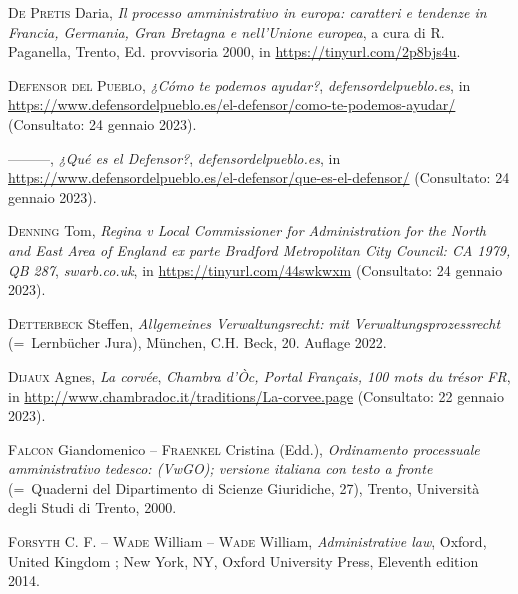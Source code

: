 \documentclass[12pt,it,a4paper,]{report}
\newlength{\cslhangindent}
\newenvironment{CSLReferences}[2] %
 {%
  \setlength{\parindent}{0pt}
  \ifodd #1 \everypar{\setlength{\hangindent}{\cslhangindent}}\ignorespaces\fi
  \ifnum #2 > 0
  \setlength{\parskip}{#2\baselineskip}
  \fi
 }%
 {}
\begin{document}
\begin{CSLReferences}{1}{0}
\leavevmode{}%
\textsc{De Pretis} Daria, \emph{Il processo amministrativo in europa:
caratteri e tendenze in Francia, Germania, Gran Bretagna e nell'Unione
europea}, a cura di R. Paganella, Trento, Ed. provvisoria 2000, in
\url{https://tinyurl.com/2p8bjs4u}.

\leavevmode{}%
\textsc{Defensor del Pueblo}, \emph{¿Cómo te podemos ayudar?},
\emph{defensordelpueblo.es}, in
\url{https://www.defensordelpueblo.es/el-defensor/como-te-podemos-ayudar/}
(Consultato: 24 gennaio 2023).

\leavevmode{}%
---------, \emph{¿Qué es el Defensor?}, \emph{defensordelpueblo.es}, in
\url{https://www.defensordelpueblo.es/el-defensor/que-es-el-defensor/}
(Consultato: 24 gennaio 2023).

\leavevmode{}%
\textsc{Denning} Tom, \emph{Regina v Local Commissioner for
Administration for the North and East Area of England ex parte Bradford
Metropolitan City Council: CA 1979, QB 287}, \emph{swarb.co.uk}, in
\url{https://tinyurl.com/44swkwxm} (Consultato: 24 gennaio 2023).

\leavevmode{}%
\textsc{Detterbeck} Steffen, \emph{Allgemeines Verwaltungsrecht: mit
Verwaltungsprozessrecht} (=~Lernbücher Jura), München, C.H. Beck, 20.
Auflage 2022.

\leavevmode{}%
\textsc{Dijaux} Agnes, \emph{La corvée}, \emph{Chambra d'Òc, Portal
Français, 100 mots du trésor FR}, in
\url{http://www.chambradoc.it/traditions/La-corvee.page} (Consultato: 22
gennaio 2023).

\leavevmode{}%
\textsc{Falcon} Giandomenico -- \textsc{Fraenkel} Cristina (Edd.),
\emph{Ordinamento processuale amministrativo tedesco: (VwGO); versione
italiana con testo a fronte} (=~Quaderni del Dipartimento di Scienze
Giuridiche, 27), Trento, Università degli Studi di Trento, 2000.

\leavevmode{}%
\textsc{Forsyth} C. F. -- \textsc{Wade} William -- \textsc{Wade}
William, \emph{Administrative law}, Oxford, United Kingdom ; New York,
NY, Oxford University Press, Eleventh edition 2014.


\end{CSLReferences}
\end{document}
